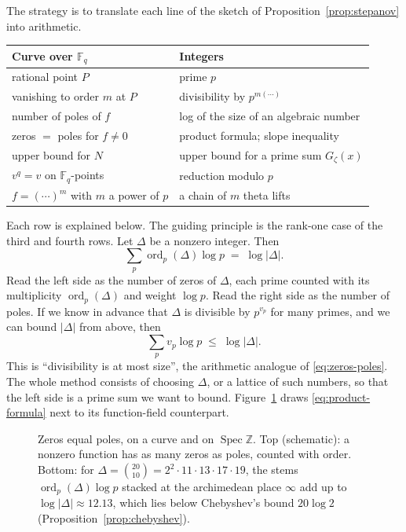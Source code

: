 \documentclass[11pt]{amsbook}
\theoremstyle{plain}
\theoremstyle{definition}
\theoremstyle{remark}
\numberwithin{equation}{section}
\numberwithin{figure}{chapter}
\numberwithin{table}{chapter}
\newcommand{\Z}{\mathbb{Z}}
\newcommand{\F}{\mathbb{F}}
\newcommand{\Gz}{G_{\zeta}}
\newcommand{\ord}{\operatorname{ord}}
\begin{document}
The strategy is to translate each line of the sketch of
Proposition~\ref{prop:stepanov} into arithmetic.

\medskip
\begin{center}
\begin{tabular}{@{}ll@{}}
\toprule
Curve over $\F_q$ & Integers \\
\midrule
rational point $P$ & prime $p$ \\
vanishing to order $m$ at $P$ & divisibility by $p^{m(\cdots)}$ \\
number of poles of $f$ & log of the size of an algebraic number \\
zeros $=$ poles for $f \ne 0$ & product formula; slope inequality \\
upper bound for $N$ & upper bound for a prime sum $\Gz(x)$ \\
$v^q = v$ on $\F_q$-points & reduction modulo $p$ \\
$f = (\cdots)^m$ with $m$ a power of $p$
  & a chain of $m$ theta lifts \\
\bottomrule
\end{tabular}
\end{center}
\medskip

Each row is explained below. The guiding principle is the rank-one
case of the third and fourth rows. Let $\Delta$ be a nonzero
integer. Then
\begin{equation}\label{eq:product-formula}
  \sum_{p} \ord_p(\Delta) \log p \;=\; \log |\Delta| .
\end{equation}
Read the left side as the number of zeros of $\Delta$, each prime
counted with its multiplicity $\ord_p(\Delta)$ and weight $\log p$.
Read the right side as the number of poles. If we know in advance
that $\Delta$ is divisible by $p^{v_p}$ for many primes, and we can
bound $|\Delta|$ from above, then
\begin{equation}\label{eq:div-size}
  \sum_p v_p \log p \;\le\; \log |\Delta| .
\end{equation}
This is ``divisibility is at most size'', the arithmetic analogue of
\eqref{eq:zeros-poles}. The whole method consists of choosing
$\Delta$, or a lattice of such numbers, so that the left side is a
prime sum we want to bound. Figure~\ref{fig:product-formula} draws
\eqref{eq:product-formula} next to its function-field counterpart.
\begin{figure}[tbp]
\centering
{}
\caption{Zeros equal poles, on a curve and on
$\operatorname{Spec}\Z$. Top (schematic): a nonzero function has as
many zeros as poles, counted with order. Bottom: for
$\Delta=\binom{20}{10}=2^2\cdot11\cdot13\cdot17\cdot19$, the stems
$\ord_p(\Delta)\log p$ stacked at the archimedean place $\infty$ add
up to $\log|\Delta|\approx12.13$, which lies below Chebyshev's bound
$20\log2$ (Proposition~\ref{prop:chebyshev}).}
\label{fig:product-formula}
\end{figure}
\end{document}

